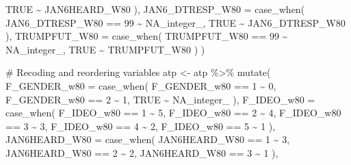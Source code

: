 \documentclass[
  letterpaper,
  DIV=11,
  numbers=noendperiod]{scrartcl}
\newenvironment{Shaded}{\begin{snugshade}}{\end{snugshade}}
\newcommand{\AttributeTok}[1]{\textcolor[rgb]{0.40,0.45,0.13}{#1}}
\newcommand{\CommentTok}[1]{\textcolor[rgb]{0.37,0.37,0.37}{#1}}
\newcommand{\ConstantTok}[1]{\textcolor[rgb]{0.56,0.35,0.01}{#1}}
\newcommand{\DecValTok}[1]{\textcolor[rgb]{0.68,0.00,0.00}{#1}}
\newcommand{\FunctionTok}[1]{\textcolor[rgb]{0.28,0.35,0.67}{#1}}
\newcommand{\NormalTok}[1]{\textcolor[rgb]{0.00,0.23,0.31}{#1}}
\newcommand{\OtherTok}[1]{\textcolor[rgb]{0.00,0.23,0.31}{#1}}
\newcommand{\SpecialCharTok}[1]{\textcolor[rgb]{0.37,0.37,0.37}{#1}}
\begin{document}
\begin{Shaded}
\begin{Highlighting}[]
      \ConstantTok{TRUE} \SpecialCharTok{\textasciitilde{}}\NormalTok{ JAN6HEARD\_W80}
\NormalTok{    ),}
    \AttributeTok{JAN6\_DTRESP\_W80 =} \FunctionTok{case\_when}\NormalTok{(}
\NormalTok{      JAN6\_DTRESP\_W80 }\SpecialCharTok{==} \DecValTok{99} \SpecialCharTok{\textasciitilde{}} \ConstantTok{NA\_integer\_}\NormalTok{,}
      \ConstantTok{TRUE} \SpecialCharTok{\textasciitilde{}}\NormalTok{ JAN6\_DTRESP\_W80}
\NormalTok{    ),}
    \AttributeTok{TRUMPFUT\_W80 =} \FunctionTok{case\_when}\NormalTok{(}
\NormalTok{      TRUMPFUT\_W80 }\SpecialCharTok{==} \DecValTok{99} \SpecialCharTok{\textasciitilde{}} \ConstantTok{NA\_integer\_}\NormalTok{,}
      \ConstantTok{TRUE} \SpecialCharTok{\textasciitilde{}}\NormalTok{ TRUMPFUT\_W80}
\NormalTok{    )}
\NormalTok{  )}

\CommentTok{\# Recoding and reordering variables}
\NormalTok{atp }\OtherTok{\textless{}{-}}\NormalTok{ atp }\SpecialCharTok{\%\textgreater{}\%}  
\FunctionTok{mutate}\NormalTok{(}
    \AttributeTok{F\_GENDER\_w80 =} \FunctionTok{case\_when}\NormalTok{(}
\NormalTok{      F\_GENDER\_w80 }\SpecialCharTok{==} \DecValTok{1} \SpecialCharTok{\textasciitilde{}} \DecValTok{0}\NormalTok{,}
\NormalTok{      F\_GENDER\_w80 }\SpecialCharTok{==} \DecValTok{2} \SpecialCharTok{\textasciitilde{}} \DecValTok{1}\NormalTok{,}
      \ConstantTok{TRUE} \SpecialCharTok{\textasciitilde{}} \ConstantTok{NA\_integer\_}
\NormalTok{    ),}
    \AttributeTok{F\_IDEO\_w80 =} \FunctionTok{case\_when}\NormalTok{( }
\NormalTok{    F\_IDEO\_w80 }\SpecialCharTok{==} \DecValTok{1} \SpecialCharTok{\textasciitilde{}} \DecValTok{5}\NormalTok{,}
\NormalTok{    F\_IDEO\_w80 }\SpecialCharTok{==} \DecValTok{2} \SpecialCharTok{\textasciitilde{}} \DecValTok{4}\NormalTok{,}
\NormalTok{    F\_IDEO\_w80 }\SpecialCharTok{==} \DecValTok{3} \SpecialCharTok{\textasciitilde{}} \DecValTok{3}\NormalTok{,}
\NormalTok{    F\_IDEO\_w80 }\SpecialCharTok{==} \DecValTok{4} \SpecialCharTok{\textasciitilde{}} \DecValTok{2}\NormalTok{,}
\NormalTok{    F\_IDEO\_w80 }\SpecialCharTok{==} \DecValTok{5} \SpecialCharTok{\textasciitilde{}} \DecValTok{1}
\NormalTok{    ),}
    \AttributeTok{JAN6HEARD\_W80 =} \FunctionTok{case\_when}\NormalTok{( }
\NormalTok{    JAN6HEARD\_W80 }\SpecialCharTok{==} \DecValTok{1} \SpecialCharTok{\textasciitilde{}} \DecValTok{3}\NormalTok{,}
\NormalTok{    JAN6HEARD\_W80 }\SpecialCharTok{==} \DecValTok{2} \SpecialCharTok{\textasciitilde{}} \DecValTok{2}\NormalTok{,}
\NormalTok{    JAN6HEARD\_W80 }\SpecialCharTok{==} \DecValTok{3} \SpecialCharTok{\textasciitilde{}} \DecValTok{1}
\NormalTok{    ),}

\end{Highlighting}
\end{Shaded}
\end{document}
